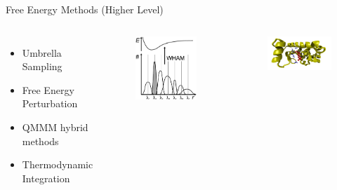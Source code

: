 \begin{frame}{Free Energy Methods (Higher Level)}
\begin{columns}
\begin{itemize}
	\item Umbrella Sampling
	\vspace{0.8 cm}
	\item Free Energy Perturbation
	\vspace{0.8 cm}
	\item QMMM hybrid methods
	\vspace{0.8 cm}
	\item Thermodynamic Integration
\end{itemize}
\begin{figure}
\includegraphics[height=0.35\textheight]{figures/Me/Wham_Hist}
\end{figure}
\begin{figure}
\includegraphics[height=0.35\textheight]{../Graphics/Theory/QMMM.png}
\end{figure}
\end{columns}

\end{frame}